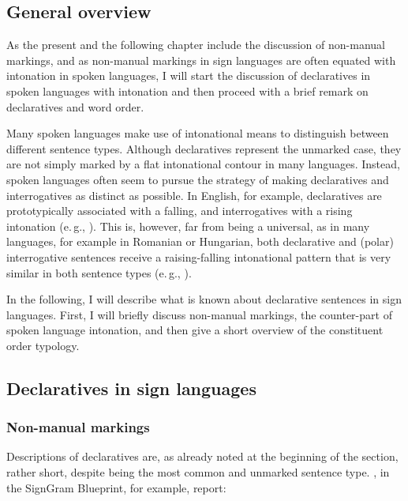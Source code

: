\subsection{General overview}
As the present and the following chapter include the discussion of non-manual markings, and as non-manual markings in sign languages are often equated with intonation in spoken languages, I will start the discussion of declaratives in spoken languages with intonation and then proceed with a brief remark on declaratives and word order.

Many spoken languages make use of intonational means to distinguish between different sentence types. Although declaratives represent the unmarked case, they are not simply marked by a flat intonational contour in many languages. Instead, spoken languages often seem to pursue the strategy of making declaratives and interrogatives as distinct as possible. In English, for example, declaratives are prototypically associated with a falling, and interrogatives with a rising intonation (e.\,g., \citealt{gunlogson2002declarative}). This is, however, far from being a universal, as in many languages, for example in Romanian or Hungarian, both declarative and (polar) interrogative sentences receive a raising-falling intonational pattern that is very similar in both sentence types (e.\,g., \citealt{ladd1981intonational}).


In the following, I will describe what is known about declarative sentences in sign languages. First, I will briefly discuss non-manual markings, the counter-part of spoken language intonation, and then give a short overview of the constituent order typology. 

\subsection{Declaratives in sign languages}
\subsubsection{Non-manual markings}
Descriptions of declaratives are, as already noted at the beginning of the section, rather short, despite being the most common and unmarked sentence type. \citet[289]{signgram2017}, in the SignGram Blueprint, for example, report:

